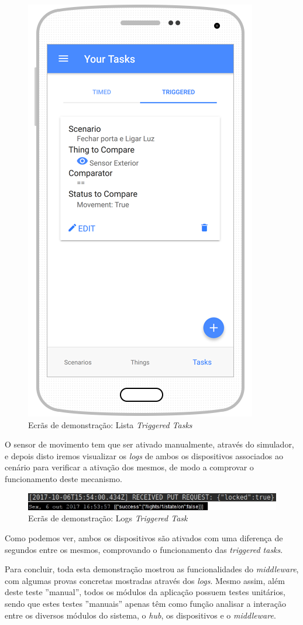 \begin{figure}[H]
  \centering
        \includegraphics[scale=0.6]{img/demo/show_triggered_task.png}
  \caption{Ecrãs de demonstração: Lista \textit{Triggered Tasks}}
\end{figure}

O sensor de movimento tem que ser ativado manualmente, através do simulador, e depois disto iremos visualizar os \textit{logs} de ambos os dispositivos associados ao cenário para verificar a ativação dos mesmos, de modo a comprovar o funcionamento deste mecanismo.

\begin{figure}[H]
  \centering
        \includegraphics[scale=0.6]{img/demo/logs_triggered_task.jpg}
  \caption{Ecrãs de demonstração: Logs \textit{Triggered Task}}
\end{figure}

Como podemos ver, ambos os dispositivos são ativados com uma diferença de segundos entre os mesmos, comprovando o funcionamento das \textit{triggered tasks}.

Para concluir, toda esta demonstração mostrou as funcionalidades do \textit{middleware}, com algumas provas concretas mostradas através dos \textit{logs}. Mesmo assim, além deste teste ''manual'', todos os módulos da aplicação possuem testes unitários, sendo que estes testes ''manuais'' apenas têm como função analisar a interação entre os diversos módulos do sistema, o \textit{hub}, os dispositivos e o \textit{middleware}.